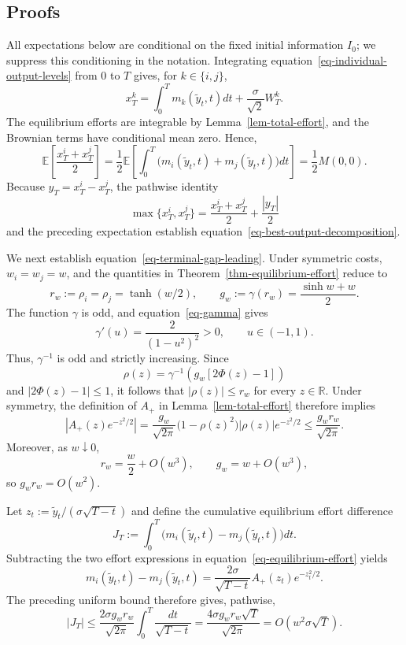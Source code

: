 \documentclass[mnsc]{informs3}
\begin{document}
\begin{APPENDICES}


\section{Proofs}

All expectations below are conditional on the fixed initial information $I_0$; we suppress this conditioning in the notation.
Integrating equation~\eqref{eq-individual-output-levels} from $0$ to $T$ gives, for $k\in\{i,j\}$,
\[
x_T^k=\int_0^T m_k(\tilde y_t,t)dt+\frac{\sigma}{\sqrt2}W_T^k.
\]
The equilibrium efforts are integrable by Lemma~\ref{lem-total-effort}, and the Brownian terms have conditional mean zero. Hence,
\[
\mathbb E\left[\frac{x_T^i+x_T^j}{2}\right]
=\frac12\mathbb E\left[\int_0^T
\bigl(m_i(\tilde y_t,t)+m_j(\tilde y_t,t)\bigr)dt\right]
=\frac12M(0,0).
\]
Because $y_T=x_T^i-x_T^j$, the pathwise identity
\[
\max\{x_T^i,x_T^j\}
=\frac{x_T^i+x_T^j}{2}+\frac{|y_T|}{2}
\]
and the preceding expectation establish equation~\eqref{eq-best-output-decomposition}.

We next establish equation~\eqref{eq-terminal-gap-leading}.
Under symmetric costs, $w_i=w_j=w$, and the quantities in Theorem~\ref{thm-equilibrium-effort} reduce to
\[
r_w:=\rho_i=\rho_j=\tanh(w/2),
\qquad
g_w:=\gamma(r_w)=\frac{\sinh w+w}{2}.
\]
The function $\gamma$ is odd, and equation~\eqref{eq-gamma} gives
\[
\gamma'(u)=\frac{2}{(1-u^2)^2}>0,
\qquad u\in(-1,1).
\]
Thus, $\gamma^{-1}$ is odd and strictly increasing. Since
\[
\rho(z)=\gamma^{-1}\!\left(g_w[2\Phi(z)-1]\right)
\]
and $|2\Phi(z)-1|\leq1$, it follows that $|\rho(z)|\leq r_w$ for every $z\in\mathbb R$.
Under symmetry, the definition of $A_+$ in Lemma~\ref{lem-total-effort} therefore implies
\[
\left|A_+(z)e^{-z^2/2}\right|
=\frac{g_w}{\sqrt{2\pi}}
\bigl(1-\rho(z)^2\bigr)|\rho(z)|e^{-z^2/2}
\leq\frac{g_wr_w}{\sqrt{2\pi}}.
\]
Moreover, as $w\downarrow0$,
\[
r_w=\frac{w}{2}+O(w^3),
\qquad
g_w=w+O(w^3),
\]
so $g_wr_w=O(w^2)$.

Let $z_t:=\tilde y_t/(\sigma\sqrt{T-t})$ and define the cumulative equilibrium effort difference
\[
J_T:=\int_0^T
\bigl(m_i(\tilde y_t,t)-m_j(\tilde y_t,t)\bigr)dt.
\]
Subtracting the two effort expressions in equation~\eqref{eq-equilibrium-effort} yields
\[
m_i(\tilde y_t,t)-m_j(\tilde y_t,t)
=\frac{2\sigma}{\sqrt{T-t}}A_+(z_t)e^{-z_t^2/2}.
\]
The preceding uniform bound therefore gives, pathwise,
\[
|J_T|
\leq\frac{2\sigma g_wr_w}{\sqrt{2\pi}}
\int_0^T\frac{dt}{\sqrt{T-t}}
=\frac{4\sigma g_wr_w\sqrt T}{\sqrt{2\pi}}
=O(w^2\sigma\sqrt T).
\]


\end{APPENDICES}
\end{document}
